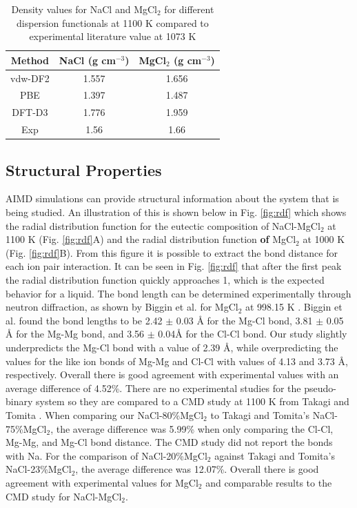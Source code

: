 \documentclass[review]{elsarticle}
\providecommand{\DIFaddtex}[1]{{\bf #1}} %
\providecommand{\DIFdeltex}[1]{} %
\providecommand{\DIFaddbegin}{\protect\color{blue}} %
\providecommand{\DIFaddend}{\protect\color{black}} %
\providecommand{\DIFdelbegin}{\protect\color{red}} %
\providecommand{\DIFdelend}{\protect\color{black}} %
\providecommand{\DIFadd}[1]{\texorpdfstring{\DIFaddtex{#1}}{#1}} %
\providecommand{\DIFdel}[1]{\texorpdfstring{\DIFdeltex{#1}}{}} %
\newcommand{\DIFscaledelfig}{0.5}
\newlength{\DIFdelgraphicswidth} %
\newlength{\DIFdelgraphicsheight} %
\newcommand{\DIFaddincludegraphics}[2][]{{\color{blue}\fbox{\DIFOincludegraphics[#1]{#2}}}} %
\newcommand{\DIFdelincludegraphics}[2][]{%
\sbox{\DIFdelgraphicsbox}{\DIFOincludegraphics[#1]{#2}}%
\settoboxwidth{\DIFdelgraphicswidth}{\DIFdelgraphicsbox} %
\settoboxtotalheight{\DIFdelgraphicsheight}{\DIFdelgraphicsbox} %
\scalebox{\DIFscaledelfig}{%
\parbox[b]{\DIFdelgraphicswidth}{\usebox{\DIFdelgraphicsbox}\\[-\baselineskip] \rule{\DIFdelgraphicswidth}{0em}}\llap{\resizebox{\DIFdelgraphicswidth}{\DIFdelgraphicsheight}{%
\setlength{\unitlength}{\DIFdelgraphicswidth}%
\begin{picture}(1,1)%
\thicklines\linethickness{2pt} %
{\color[rgb]{1,0,0}\put(0,0){\framebox(1,1){}}}%
{\color[rgb]{1,0,0}\put(0,0){\line( 1,1){1}}}%
{\color[rgb]{1,0,0}\put(0,1){\line(1,-1){1}}}%
\end{picture}%
}\hspace*{3pt}}} %
} %
\DeclareRobustCommand{\DIFaddbegin}{\DIFOaddbegin \let\includegraphics\DIFaddincludegraphics} %
\DeclareRobustCommand{\DIFaddend}{\DIFOaddend \let\includegraphics\DIFOincludegraphics} %
\DeclareRobustCommand{\DIFdelbegin}{\DIFOdelbegin \let\includegraphics\DIFdelincludegraphics} %
\DeclareRobustCommand{\DIFdelend}{\DIFOaddend \let\includegraphics\DIFOincludegraphics} %
\begin{document}
\begin{table}[h]
\centering
\caption{Density values for NaCl and MgCl$_2$ for different dispersion functionals at 1100 K compared to experimental literature value at 1073 K \cite{grjotheim1971} }
\begin{tabular}{|c|c|c|}
\hline
Method & NaCl (g cm$^{-3}$) & MgCl$_2$ (g cm$^{-3}$) \\
\hline

vdw-DF2	& 1.557       & 1.656\\
PBE	  & 1.397	      & 1.487\\
DFT-D3	& 1.776	      & 1.959\\
Exp	  & 1.56	      & 1.66\\

\hline
\end{tabular}
\label{table:functional}
\end{table}

\FloatBarrier

\subsection{Structural Properties}

AIMD simulations can provide structural information about the system that is being studied. An illustration of this is shown below in Fig. \ref{fig:rdf} which shows the radial distribution function for the eutectic composition of NaCl-MgCl$_2$ at 1100 K (Fig. \ref{fig:rdf}A) and the radial distribution function \DIFdelbegin \DIFdel{form }\DIFdelend \DIFaddbegin \DIFadd{of }\DIFaddend MgCl$_2$ at 1000 K (Fig. \ref{fig:rdf}B). From this figure it is possible to extract the bond distance for each ion pair interaction. It can be seen in Fig. \ref{fig:rdf} that after the first peak the radial distribution function quickly approaches 1, which is the expected behavior for a liquid. The bond length can be determined experimentally through neutron diffraction, as shown by Biggin et al. for MgCl$_2$ at 998.15 K \cite{biggin1984structures}. Biggin et al. found the bond lengths to be 2.42 $\pm$ 0.03 \r{A} for the Mg-Cl bond, 3.81 $\pm$ 0.05 \r{A} for the Mg-Mg bond, and  3.56 $\pm$ 0.04\r{A} for the Cl-Cl bond. Our study slightly underpredicts the Mg-Cl bond with a value of 2.39 \r{A}, while overpredicting the values for the like ion bonds of Mg-Mg and Cl-Cl with values of 4.13 and 3.73 \r{A}, respectively. Overall there is good agreement with experimental values with an average difference of 4.52\%. There are no experimental studies for the pseudo-binary system so they are compared to a CMD study at 1100 K from Takagi and Tomita \cite{takagi1993structure}. When comparing our NaCl-80\%MgCl$_2$ to Takagi and Tomita's NaCl-75\%MgCl$_2$, the average difference was 5.99\% when only comparing the Cl-Cl, Mg-Mg, and Mg-Cl bond distance. The CMD study did not report the bonds with Na. For the comparison of NaCl-20\%MgCl$_2$ against Takagi and Tomita's NaCl-23\%MgCl$_2$, the average difference was 12.07\%. Overall there is good agreement with experimental values for MgCl$_2$ and comparable results to the CMD study for NaCl-MgCl$_2$.
\end{document}
